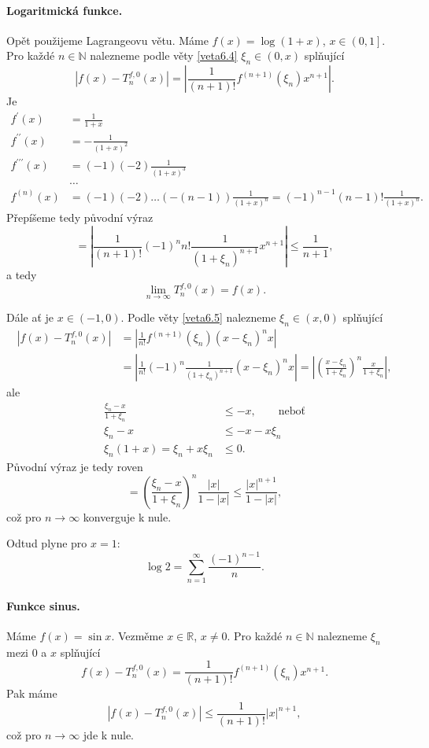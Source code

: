 \paragraph{Logaritmická funkce.} Opět použijeme Lagrangeovu větu. Máme $f(x)=\log(1+x)$, $x \in \left ( 0,1 \right ] $.
Pro každé $n \in \mathbb N $ nalezneme podle věty \ref{veta6.4} $\xi_n \in (0,x)$ splňující
$$
    |f(x) - T_n^{f,0}(x)| = \left | \frac{1}{(n+1)!}f^{(n+1)}(\xi_n) x^{n+1} \right|.
$$
Je
\begin{align*}
	f^\prime(x) &= \frac{1}{1+x} \\
	f^{\prime\prime}(x) &= -\frac{1}{(1+x)^2} \\
	f^{\prime\prime\prime}(x) &= (-1)(-2)\frac{1}{(1+x)^3} \\
	& \dots \\
	f^{(n)}(x) &= (-1)(-2) \dots (-(n-1)) \frac{1}{(1+x)^n} = (-1)^{n-1}(n-1)! \frac{1}{(1+x)^n}.
\end{align*}
Přepíšeme tedy původní výraz
$$
    = \left |\frac{1}{(n+1)!} (-1)^n n! \frac{1}{(1+\xi_n)^{n+1}}x^{n+1} \right |\leq \frac{1}{n+1},
$$
a tedy
$$
\lim_{n \to \infty} T_n^{f,0}(x)=f(x).
$$

\par Dále ať je $x \in (-1,0)$. Podle věty \ref{veta6.5} nalezneme $\xi_n \in (x,0)$ splňující
\begin{align*}
|f(x)-T_n^{f,0}(x)| &= \left |\frac{1}{n!}f^{(n+1)}(\xi_n)(x-\xi_n)^n x\right |\\
	&= \left | \frac{1}{n!}(-1)^n \frac{1}{(1+\xi_n)^{n+1}}(x-\xi_n)^n x\right| = \left | \left( \frac{x-\xi_n}{1+\xi_n} \right )^n \frac{x}{1+\xi_n}  \right|,
\end{align*}
ale
\begin{align*}
\frac{\xi_n - x}{1+\xi_n} &\leq -x, \qquad \textrm{neboť} \\
\xi_n -x&\leq -x-x\xi_n \\
\xi_n(1+x)=\xi_n+x\xi_n &\leq 0.
\end{align*}
Původní výraz je tedy roven
$$
    = \left( \frac{\xi_n - x}{1+\xi_n} \right )^n \frac{|x|}{1-|x|} \leq \frac{|x|^{n+1}}{1-|x|},
$$
což pro $n\to \infty$ konverguje k nule.

Odtud plyne pro $x=1$:
$$
    \log 2 = \sum_{n=1}^\infty \frac{(-1)^{n-1}}{n}.
$$

\paragraph{Funkce sinus.} Máme $f(x)=\sin x$. Vezměme $x \in \mathbb R $, $x\ne 0$. Pro každé
$n \in \mathbb N $ nalezneme $\xi_n$ mezi 0 a $x$ splňující
$$
    f(x)-T_n^{f,0}(x) = \frac{1}{(n+1)!}f^{(n+1)}(\xi_n)x^{n+1}.
$$
Pak máme
$$
    |f(x) - T_n^{f,0}(x)| \leq \frac{1}{(n+1)!}|x|^{n+1},
$$
což pro $n \to \infty$ jde k nule.

